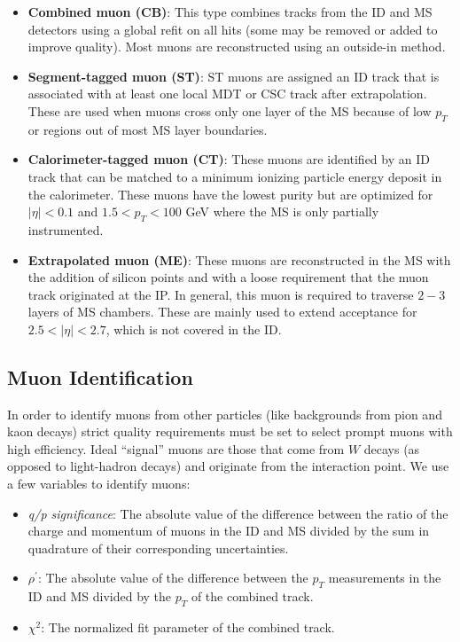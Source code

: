 \begin{itemize}
\item \textbf{Combined muon (CB)}: This type combines tracks from the ID and MS detectors using a global refit on all hits (some may be removed or added to improve quality). Most muons are reconstructed using an outside-in method. 
\item \textbf{Segment-tagged muon (ST)}: ST muons are assigned an ID track that is associated with at least one local MDT or CSC track after extrapolation. These are used when muons cross only one layer of the MS because of low $p_T$ or regions out of most MS layer boundaries. 
\item \textbf{Calorimeter-tagged muon (CT)}: These muons are identified by an ID track that can be matched to a minimum ionizing particle energy deposit in the calorimeter. These muons have the lowest purity but are optimized for $|\eta|  < 0.1$ and $1.5 < p_T < 100$ GeV where the MS is only partially instrumented. 
\item \textbf{Extrapolated muon (ME)}: These muons are reconstructed in the MS with the addition of silicon points and with a loose requirement that the muon track originated at the IP. In general, this muon is required to traverse $2-3$ layers of MS chambers. These are mainly used to extend acceptance for $2.5 < |\eta| < 2.7$, which is not covered in the ID. 
\end{itemize}

\subsection{Muon Identification}
In order to identify muons from other particles (like backgrounds from pion and kaon decays) strict quality requirements must be set to select prompt muons with high efficiency. Ideal ``signal'' muons are those that come from $W$ decays (as opposed to light-hadron decays) and originate from the interaction point. We use a few variables to identify muons:
\begin{itemize}
\item \textit{q/p significance}: The absolute value of the difference between the ratio of the charge and momentum of muons in the ID and MS divided by the sum in quadrature of their corresponding uncertainties.
\item \textit{$\rho^\prime$}: The absolute value of the difference between the $p_T$ measurements in the ID and MS divided by the $p_T$ of the combined track. 
\item \textit{$\chi ^2$}: The normalized fit parameter of the combined track.
\end{itemize}

